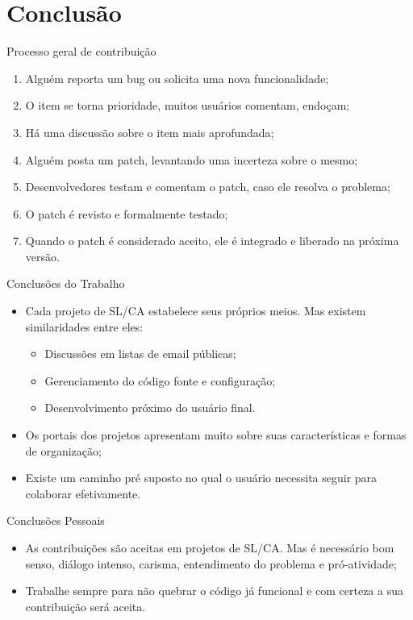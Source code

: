 \section{Conclusão}

\begin{frame}{Processo geral de contribuição}
 \begin{enumerate}
    \item <1-> Alguém reporta um bug ou solicita uma nova funcionalidade;
    \item <2-> O item se torna prioridade, muitos usuários comentam, endoçam;
    \item <3-> Há uma discussão sobre o item mais aprofundada;
    \item <4-> Alguém posta um patch, levantando uma incerteza sobre o mesmo; 
    \item <5-> Desenvolvedores testam e comentam o patch, caso ele resolva o problema;
    \item <6-> O patch é revisto e formalmente testado;
    \item <7-> Quando o patch é considerado aceito, ele é integrado e liberado na próxima versão.
  \end{enumerate}
\end{frame}

  \begin{frame}{Conclusões do Trabalho}
    \begin{itemize} 
      \item <1-> Cada projeto de SL/CA estabelece seus próprios meios. Mas existem similaridades entre eles:
      \begin{itemize}
        \item Discussões em listas de email públicas;
        \item Gerenciamento do código fonte e configuração;
        \item Desenvolvimento próximo do usuário final.
      \end{itemize}
      \item <2-> Os portais dos projetos apresentam muito sobre suas características e formas de organização;
      \item <3-> Existe um caminho pré suposto no qual o usuário necessita seguir para colaborar efetivamente.
    \end{itemize}
  \end{frame}
  \begin{frame}{Conclusões Pessoais}
    \begin{itemize}
      \item <1-> As contribuições são aceitas em projetos de SL/CA. Mas é necessário bom senso, diálogo intenso, carisma, entendimento do problema e pró-atividade;
      \item <2-> Trabalhe sempre para não quebrar o código já funcional e com certeza a sua contribuição será aceita.
    \end{itemize}
  \end{frame}

